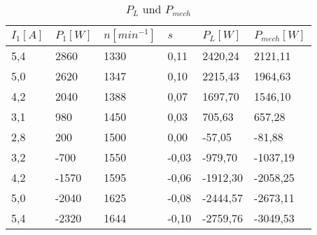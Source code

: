 \begin{table}[htbp]
   \centering
   \begin{tabularx}{\columnwidth}{XXXXXX}
      \toprule
      $I_1[A]$ & $P_1[W]$ & $n[min^{-1}]$ & $s$   & $P_L[W]$ & $P_{mech}[W]$ \\
      \midrule
      5,4      & 2860     & 1330                       & 0,11  & 2420,24  & 2121,11       \\
      5,0      & 2620     & 1347                       & 0,10  & 2215,43  & 1964,63       \\
      4,2      & 2040     & 1388                       & 0,07  & 1697,70  & 1546,10       \\
      3,1      & 980      & 1450                       & 0,03  & 705,63   & 657,28        \\
      2,8      & 200      & 1500                       & 0,00  & -57,05   & -81,88        \\
      3,2      & -700     & 1550                       & -0,03 & -979,70  & -1037,19      \\
      4,2      & -1570    & 1595                       & -0,06 & -1912,30 & -2058,25      \\
      5,0      & -2040    & 1625                       & -0,08 & -2444,57 & -2673,11      \\
      5,4      & -2320    & 1644                       & -0,10 & -2759,76 & -3049,53      \\
      \bottomrule
   \end{tabularx}
   \caption{$P_L$ und $P_{mech}$}
   \label{tab:drehmomente_vergleichen}
\end{table}


